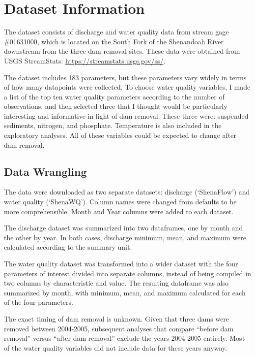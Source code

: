 \documentclass[
  12pt,
]{article}
\begin{document}
\newpage

\hypertarget{dataset-information}{%
\section{Dataset Information}\label{dataset-information}}

The dataset consists of discharge and water quality data from stream
gage \#01631000, which is located on the South Fork of the Shenandoah
River downstream from the three dam removal sites. These data were
obtained from USGS StreamStats: \url{https://streamstats.usgs.gov/ss/}.

The dataset includes 183 parameters, but these parameters vary widely in
terms of how many datapoints were collected. To choose water quality
variables, I made a list of the top ten water quality parameters
according to the number of observations, and then selected three that I
thought would be particularly interesting and informative in light of
dam removal. These three were: suspended sediments, nitrogen, and
phosphate. Temperature is also included in the exploratory analyses. All
of these variables could be expected to change after dam removal.

\hypertarget{data-wrangling}{%
\subsection{Data Wrangling}\label{data-wrangling}}

The data were downloaded as two separate datasets: discharge
(`ShenaFlow') and water quality (`ShenaWQ'). Column names were changed
from defaults to be more comprehensible. Month and Year columns were
added to each dataset.

The discharge dataset was summarized into two dataframes, one by month
and the other by year. In both cases, discharge minimum, mean, and
maximum were calculated according to the summary unit.

The water quality dataset was transformed into a wider dataset with the
four parameters of interest divided into separate columns, instead of
being compiled in two columns by characteristic and value. The resulting
dataframe was also summarized by month, with minimum, mean, and maximum
calculated for each of the four parameters.

The exact timing of dam removal is unknown. Given that three dams were
removed between 2004-2005, subsequent analyses that compare ``before dam
removal'' versus ``after dam removal'' exclude the years 2004-2005
entirely. Most of the water quality variables did not include data for
these years anyway.
\end{document}
